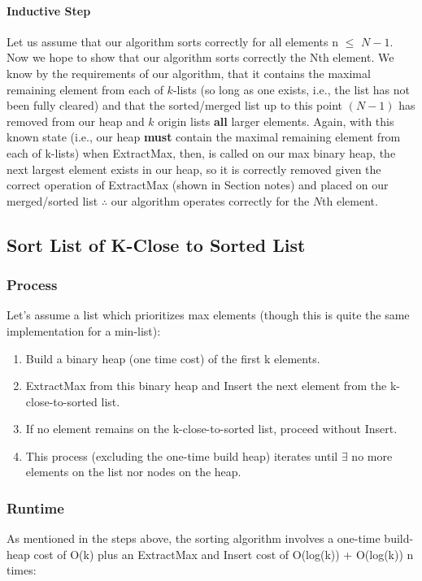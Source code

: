 \documentclass[conference]{styles/acmsiggraph}
\newcommand{\?}{\stackrel{?}{=}}
\newcommand\subsubsubsection{\paragraph}
\begin{document}
\subsubsubsection{Inductive Step}
Let us assume that our algorithm sorts correctly for all elements n $\leq$ $N-1$.  Now we hope to show that our algorithm sorts correctly the Nth element.  We know by the requirements of our algorithm, that it contains the maximal remaining element from each of $k$-lists (so long as one exists, i.e., the list has not been fully cleared) and that the sorted/merged list up to this point $(N-1)$ has removed from our heap and $k$ origin lists \textbf{all} larger elements.  Again, with this known state (i.e., our heap \textbf{must} contain the maximal remaining element from each of k-lists) when ExtractMax, then, is called on our max binary heap, the next largest element exists in our heap, so it is correctly removed given the correct operation of ExtractMax (shown in Section notes) and placed on our merged/sorted list $\therefore$ our algorithm operates correctly for the $N$th element.



\subsection{Sort List of K-Close to Sorted List}
\subsubsection{Process}
Let's assume a list which prioritizes max elements (though this is quite the same implementation for a min-list):
\begin{enumerate}
    \item Build a binary heap (one time cost) of the first k elements.
    \item ExtractMax from this binary heap and Insert the next element from the k-close-to-sorted list.
    \item If no element remains on the k-close-to-sorted list, proceed without Insert.
    \item This process (excluding the one-time build heap) iterates until $\exists$ no more elements on the list nor nodes on the heap.
\end{enumerate}

\subsubsection{Runtime}
As mentioned in the steps above, the sorting algorithm involves a one-time build-heap cost of O(k) plus an ExtractMax and Insert cost of O(log(k)) + O(log(k)) n times:
\end{document}
